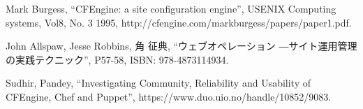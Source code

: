\begin{thebibliography}{99}
Mark Burgess, ``CFEngine: a site configuration engine'',
USENIX Computing systems, Vol8, No. 3 1995,
http://cfengine.com/markburgess/papers/paper1.pdf.

John Allspaw, Jesse Robbins, 角 征典,
``ウェブオペレーション ―サイト運用管理の実践テクニック'',
P57-58, ISBN: 978-4873114934.

Sudhir, Pandey,
``Investigating Community, Reliability and Usability of CFEngine, Chef and Puppet'',
https://www.duo.uio.no/handle/10852/9083.

\end{thebibliography}
